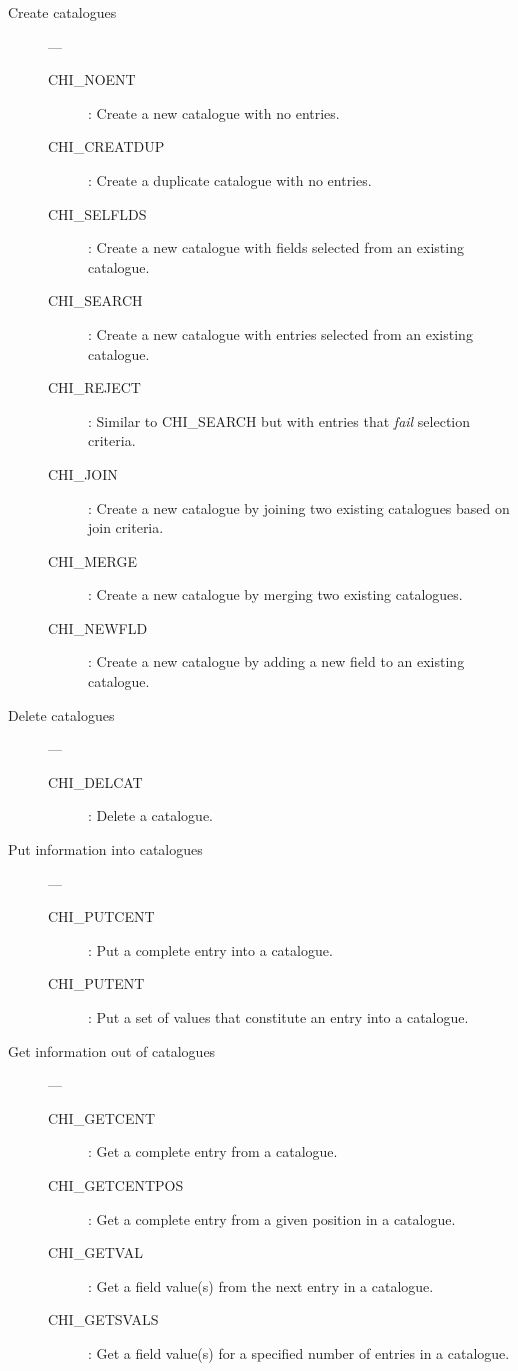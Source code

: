 \begin{description}
\item [Create catalogues] ---

\begin{description}
\item [CHI\_NOENT] : Create a new catalogue with no entries.
\item [CHI\_CREATDUP] : Create a duplicate catalogue with no entries.
\item [CHI\_SELFLDS] : Create a new catalogue with fields selected from an existing catalogue.
\item [CHI\_SEARCH] : Create a new catalogue with entries selected from an existing catalogue.
\item [CHI\_REJECT] : Similar to CHI\_SEARCH but with entries that {\em fail} selection criteria.
\item [CHI\_JOIN] : Create a new catalogue by joining two existing catalogues based on join criteria.
\item [CHI\_MERGE] : Create a new catalogue by merging two existing catalogues.
\item [CHI\_NEWFLD] : Create a new catalogue by adding a new field to an existing catalogue.
\end{description}

\item [Delete catalogues] ---

\begin{description}
\item [CHI\_DELCAT] : Delete a catalogue.
\end{description}

\item [Put information into catalogues] ---

\begin{description}
\item [CHI\_PUTCENT] : Put a complete entry into a catalogue.
\item [CHI\_PUTENT] :  Put a set of values that constitute an entry into a catalogue.
\end{description}

\item [Get information out of catalogues] ---

\begin{description}
\item  [CHI\_GETCENT] :  Get a complete entry from a catalogue.
\item  [CHI\_GETCENTPOS] : Get a complete entry from a given position in a catalogue. 
\item  [CHI\_GETVAL] : Get a field value(s) from the next entry in a catalogue.
\item  [CHI\_GETSVALS] : Get a field value(s) for a specified number of entries in a catalogue.
\end{description}
\end{description}

